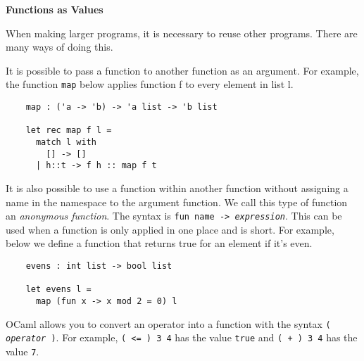 \documentclass[12pt]{article}
\begin{document}
\begin{center}\LARGE\bf
    Functions as Values
\end{center}

When making larger programs, it is necessary to reuse other programs. There are many ways of doing this.

It is possible to pass a function to another function as an argument. For example, the function \texttt{map}
below applies function f to every element in list l.
\begin{lstlisting}
    map : ('a -> 'b) -> 'a list -> 'b list

    let rec map f l =
      match l with
        [] -> []
      | h::t -> f h :: map f t
\end{lstlisting}

It is also possible to use a function within another function without assigning a name in the namespace to the argument function.
We call this type of function an \textit{anonymous function}. The syntax is
\texttt{fun name -> \textit{expression}}. This can be used when a function is only applied in one place and is
short. For example, below we define a function that returns true for an element if it's even.
\begin{lstlisting}
    evens : int list -> bool list

    let evens l =
      map (fun x -> x mod 2 = 0) l
\end{lstlisting}

OCaml allows you to convert an operator into a function with the syntax \texttt{( \textit{operator} )}. For example,
\texttt{( <= ) 3 4} has the value \texttt{true} and \texttt{( + ) 3 4} has the value \texttt{7}.
\end{document}
